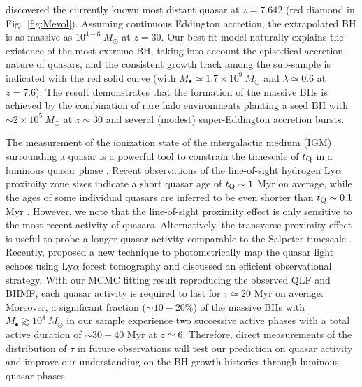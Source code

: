 \documentclass[twocolumn, twocolappendix]{aastex63}
\newcommand{\Msun}{M_\odot}
\newcommand{\red}[1]{\textcolor{red}{ #1}}
\begin{document}
\begin{CJK*}{UTF8}{gbsn}
\citet{2021ApJ...907L...1W} discovered the currently known most distant quasar at $z=7.642$ (red diamond in Fig.~\ref{fig:Mevol}).
Assuming continuous Eddington accretion, the extrapolated BH is as massive as $10^{4-6}~\Msun$ at $z= 30$. 
Our best-fit model naturally explains the existence of the most extreme BH,
taking into account the episodical accretion nature of quasars,
and the consistent growth track among the sub-sample is indicated with the red solid curve 
(with $M_\bullet \simeq 1.7\times 10^9~\Msun$ and $\lambda \simeq 0.6$ at $z=7.6$).
The result demonstrates that the formation of the massive BHs is achieved by the combination of rare halo environments planting a seed BH 
with $\sim 2\times 10^5~\Msun$ at $z\sim 30$ and several (modest) super-Eddington accretion bursts.


The measurement of the ionization state of the intergalactic medium (IGM) surrounding a quasar is
a powerful tool to constrain the timescale of $t_{\rm Q}$ in a luminous quasar phase
\citep{2007MNRAS.374..493B,2016ApJ...824..133K,2017ApJ...840...24E,2019ApJ...884L..19D}.
Recent observations of the line-of-sight hydrogen Ly$\alpha$ proximity zone sizes indicate
a short quasar age of $t_{\rm Q} \sim 1$ Myr on average, while the ages of some individual quasars are
inferred to be even shorter than $t_{\rm Q} \sim 0.1$ Myr \citep[e.g.,][]{2020ApJ...903...60I,2021ApJ...917...38E}.
However, we note that the line-of-sight proximity effect is only sensitive to the most recent activity of quasars.
Alternatively, the transverse proximity effect is useful to probe a longer quasar activity comparable to the Salpeter timescale \citep{2004ApJ...612..706A,2008ApJ...674..660V,2019ApJ...882..165S}.
Recently, \citet{2022MNRAS.516..582K} proposed a new technique to photometrically map the quasar light echoes using Ly$\alpha$ forest tomography
and discussed an efficient observational strategy.
With our MCMC fitting result reproducing the observed QLF and BHMF, each quasar activity is required to last for $\tau \simeq 20$ Myr on average.
Moreover, a significant fraction ($\sim 10-20\%$) of the massive BHs with $M_\bullet \gtrsim 10^8~\Msun$ in our sample experience
two successive active phases with a total active duration of $\sim 30-40$ Myr at $z\simeq 6$.
Therefore, direct measurements of the distribution of $\tau$ in future observations will test our prediction on quasar activity and
improve our understanding on the BH growth histories through luminous quasar phases.




\end{CJK*}
\end{document}

